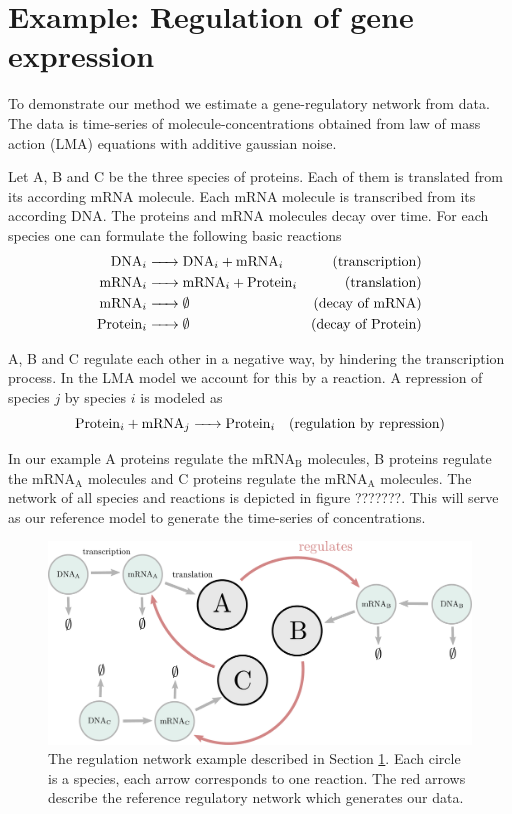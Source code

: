 \documentclass[oneside, abstracton, titlepage]{scrartcl}
\begin{document}
\section{Example: Regulation of gene expression}\label{sec:generegulation}

To demonstrate our method we estimate a gene-regulatory network from data. The data is time-series of molecule-concentrations obtained from law of mass action (LMA) equations with additive gaussian noise.

Let A, B and C be the three species of proteins. Each of them is translated from its according mRNA molecule. Each mRNA molecule is transcribed from its according DNA. The proteins and mRNA molecules decay over time. For each species one can formulate the following basic reactions
\begin{align*}
    \ce{ DNA_i } & \ce{ -> DNA_i + mRNA_i } &\text{(transcription)} \\
    \ce{ mRNA_i } & \ce{ -> mRNA_i + Protein_i } &\text{(translation)} \\
    \ce{ mRNA_i } & \ce{ -> } \emptyset &\text{(decay of mRNA)} \\
    \ce{ Protein_i } & \ce{ -> } \emptyset &\text{(decay of Protein)}
\end{align*}

A, B and C regulate each other in a negative way, by hindering the transcription process. In the LMA model we account for this by a reaction. A repression of species $j$ by species $i$ is modeled as
\begin{equation*}
    \ce{ Protein_i + mRNA_j -> Protein_i } \quad \text{(regulation by repression)}
\end{equation*}

In our example A proteins regulate the mRNA$_\mathrm{B}$ molecules, B proteins regulate the mRNA$_\mathrm{A}$ molecules and C proteins regulate the mRNA$_\mathrm{A}$ molecules. The network of all species and reactions is depicted in figure ???????. This will serve as our reference model to generate the time-series of concentrations.
\begin{figure}
    \centering
    \includegraphics[width=.5\textwidth]{./figures_tex/gene_regulation_full.pdf}
    \caption{The regulation network example described in Section \ref{sec:generegulation}. Each circle is a species, each arrow corresponds to one reaction. The red arrows describe the reference regulatory network which generates our data.}
    \label{fig:network}
\end{figure}
\end{document}
